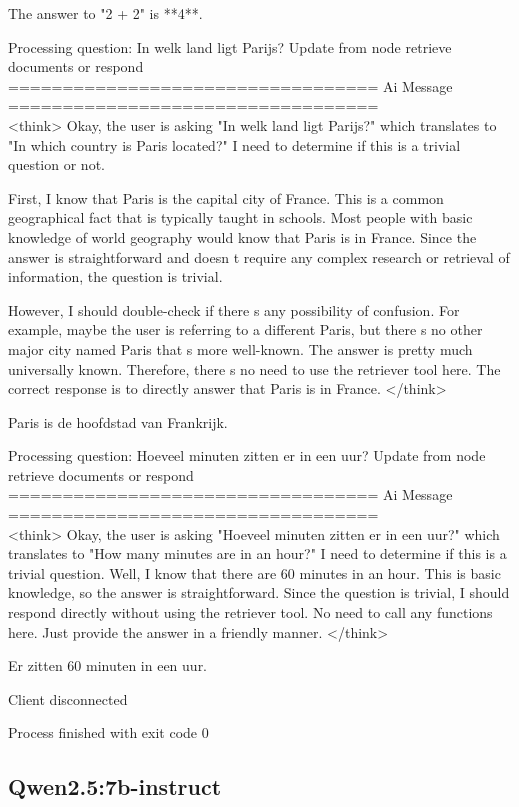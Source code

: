 The answer to "2 + 2" is **4**.

Processing question: In welk land ligt Parijs?
Update from node retrieve documents or respond
\\[1em]
================================== Ai Message ==================================
\\[1em]
<think>
Okay, the user is asking "In welk land ligt Parijs?" which translates to "In which country is Paris located?" I need to determine if this is a trivial question or not. 

First, I know that Paris is the capital city of France. This is a common geographical fact that is typically taught in schools. Most people with basic knowledge of world geography would know that Paris is in France. Since the answer is straightforward and doesn t require any complex research or retrieval of information, the question is trivial.

However, I should double-check if there s any possibility of confusion. For example, maybe the user is referring to a different Paris, but there s no other major city named Paris that s more well-known. The answer is pretty much universally known. Therefore, there s no need to use the retriever tool here. The correct response is to directly answer that Paris is in France.
</think>

Paris is de hoofdstad van Frankrijk.

Processing question: Hoeveel minuten zitten er in een uur?
Update from node retrieve documents or respond
\\[1em]
================================== Ai Message ==================================
\\[1em]
<think>
Okay, the user is asking "Hoeveel minuten zitten er in een uur?" which translates to "How many minutes are in an hour?" I need to determine if this is a trivial question. Well, I know that there are 60 minutes in an hour. This is basic knowledge, so the answer is straightforward. Since the question is trivial, I should respond directly without using the retriever tool. No need to call any functions here. Just provide the answer in a friendly manner.
</think>

Er zitten 60 minuten in een uur.

Client disconnected

Process finished with exit code 0


\subsection{Qwen2.5:7b-instruct}

